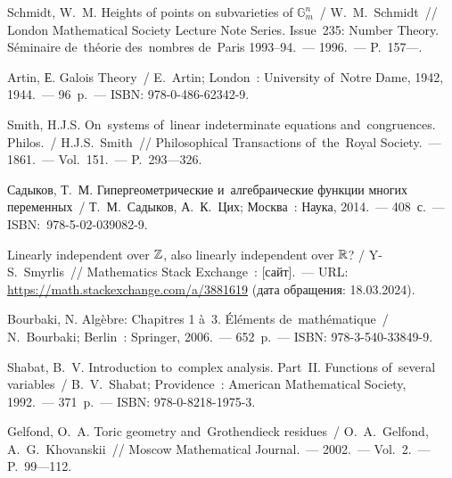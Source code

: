 \documentclass[a4paper,oneside]{article}
\begin{document}




















\pagebreak
{}
\begin{thebibliography}{}
\setlength\itemindent{12.5mm}

 Schmidt, W.~M. Heights of points on subvarieties of $\mathbb{G}^n_m$~/ W.~M.~{Sch\-midt}~//
London Mathematical Society Lecture Note Series. Issue~235: Number Theory.
Séminaire de~théorie des~nombres de~Paris 1993–94.~— 1996.~— P.~157—.

 Artin, Е. Galois Theory~/ E.~Artin; London~: University of~Notre Dame, 1942, 1944.~— 96~p.~— ISBN: 978-0-486-62342-9.

 Smith, H.J.S. On~systems of~linear indeterminate equations and~{con\-gru\-ences}. Philos.~/ H.J.S.~Smith~//
Philosophical Transactions of~the~Royal Society.~— 1861.~— Vol.~151.~— P.~293—326.

 Садыков, Т.~М. Гипергеометрические и~алгебраические функции многих переменных~/ Т.~М.~Садыков, А.~К.~Цих;
Москва~: Наука, 2014.~— 408~с.~— ISBN: 978-5-02-039082-9.

 Linearly independent over $\mathbb{Z}$, also linearly independent over $\mathbb{R}$? / Y-S.~Smyrlis~//
Mathematics Stack Exchange~: [сайт].~— URL: \url{https://math.stackexchange.com/a/3881619} (дата обращения: 18.03.2024).

 Bourbaki, N. Algèbre: Chapitres 1 à~3. Éléments de~mathématique~/ N.~Bourbaki; Berlin~: Springer, 2006.~— 652~p.~— ISBN: 978-3-540-33849-9.

 Shabat, B.~V. Introduction to~complex analysis. Part~II. Functions of~several variables~/ B.~V.~Shabat; Providence~: American Mathematical Society, 1992.~— 371~p.~— ISBN: 978-0-8218-1975-3.

 Gelfond, O.~A. Toric geometry and~Grothendieck residues~/ O.~A.~{Gel\-fond}, A.~G.~Khovanskii~//
Moscow Mathematical Journal.~— 2002.~— Vol.~2.~— P.~99—112.


\end{thebibliography}
\end{document}
